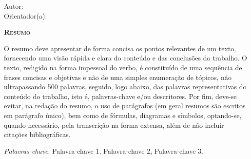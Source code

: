 \begin{center}
	{\Large{\textbf{\myThesis}}}
\end{center}

\vspace{1cm}

\begin{flushright}
	Autor: \myName\\
	Orientador(a): \mySupervisorName
\end{flushright}

\vspace{1cm}

\begin{center}
	\Large{\textsc{\textbf{Resumo}}}
\end{center}

\noindent O resumo deve apresentar de forma concisa os pontos relevantes de um
texto, fornecendo uma visão rápida e clara do conteúdo e das conclusões do
trabalho. O texto, redigido na forma impessoal do verbo, é constituído de uma
sequência de frases concisas e objetivas e não de uma simples enumeração de
tópicos, não ultrapassando 500 palavras, seguido, logo abaixo, das palavras
representativas do conteúdo do trabalho, isto é, palavras-chave e/ou
descritores. Por fim, deve-se evitar, na redação do resumo, o uso de parágrafos
(em geral resumos são escritos em parágrafo único), bem como de fórmulas,
diagramas e símbolos, optando-se, quando necessário, pela transcrição na forma
extensa, além de não incluir citações bibliográficas.

\noindent\textit{Palavras-chave}: Palavra-chave 1, Palavra-chave 2, Palavra-chave 3.